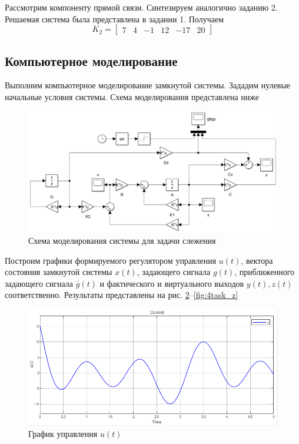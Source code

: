 \documentclass[a4paper, 12pt]{article}
\begin{document}
    Рассмотрим компоненту прямой связи. Синтезируем аналогично заданию 2. Решаемая
    система была представлена в задании 1. Получаем
    $$
    K_2=\begin{bmatrix}
        7    &4   &-1   &12  &-17   &20
    \end{bmatrix}
    $$


    \subsection{Компьютерное моделирование}
    Выполним компьютерное моделирование замкнутой системы. Зададим нулевые начальные условия системы.
    Схема моделирования представлена ниже
    \begin{figure}[H]
        \centering
        \includegraphics[scale=0.35]{4task_scheme.png}
        \captionsetup{skip=0pt}
        \caption{Схема моделирования системы для задачи слежения}
        \label{fig:4task_scheme}
    \end{figure}
    \noindent Построим графики формируемого регулятором управления $u(t)$, вектора состояния замкнутой
    системы $x(t)$, задающего сигнала $g(t)$, приближенного задающего сигнала $\bar{g}(t)$ и
    фактического и виртуального выходов $y(t),z(t)$ соответственно. Результаты представлены
    на рис. \ref{fig:4task_u}--\ref{fig:4task_z}
    \begin{figure}[H]
        \centering
        \includegraphics[scale=0.75]{4task_u.png}
        \captionsetup{skip=0pt}
        \caption{График управления $u(t)$}
        \label{fig:4task_u}
    \end{figure}
\end{document}

